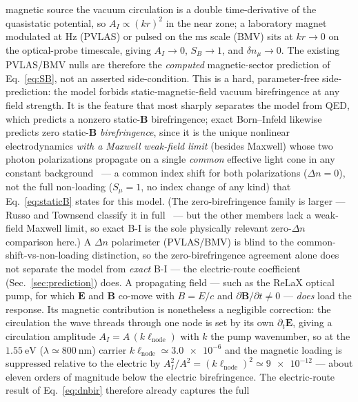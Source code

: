 \documentclass[aps,prd,twocolumn,superscriptaddress,nofootinbib,longbibliography]{revtex4-2}
\begin{document}
magnetic source the vacuum circulation is a double time-derivative of the
quasistatic potential, so $A_I\propto(kr)^2$ in the near zone; a laboratory magnet
modulated at $\si{\hertz}$ (PVLAS) or pulsed on the $\si{\milli\second}$ scale
(BMV) sits at $kr\to0$ on the optical-probe timescale, giving $A_I\to0$,
$S_B\to1$, and $\delta n_\mu\to0$. The existing PVLAS/BMV nulls are therefore the
\emph{computed} magnetic-sector prediction of Eq.~\eqref{eq:SB}, not an asserted
side-condition. This is a hard, parameter-free side-prediction: the model forbids
static-magnetic-field vacuum birefringence at any field strength. It is the
feature that most sharply separates the model from QED, which predicts a nonzero
static-$\mathbf B$ birefringence; exact Born--Infeld likewise predicts zero
static-$\mathbf B$ \emph{birefringence}, since it is the unique nonlinear
electrodynamics \emph{with a Maxwell weak-field limit} (besides Maxwell) whose two
photon polarizations propagate on a single \emph{common} effective light cone in
any constant background~\cite{Boillat1970,BornInfeld1934} --- a common index shift
for both polarizations ($\Delta n=0$), not the full non-loading ($S_\mu=1$, no
index change of any kind) that Eq.~\eqref{eq:staticB} states for this model. (The
zero-birefringence family is larger --- Russo and Townsend classify it in
full~\cite{RussoTownsend2023} --- but the other members lack a weak-field Maxwell
limit, so exact B-I is the sole physically relevant zero-$\Delta n$ comparison
here.) A $\Delta n$ polarimeter (PVLAS/BMV) is blind to the common-shift-vs-non-loading
distinction, so the zero-birefringence agreement alone does not separate the model
from \emph{exact} B-I --- the electric-route
coefficient (Sec.~\ref{sec:prediction}) does. A propagating field --- such as the
ReLaX optical pump, for which
$\mathbf E$ and $\mathbf B$ co-move with $B=E/c$ and $\partial\mathbf
B/\partial t\ne0$ --- \emph{does} load the response. Its magnetic contribution is
nonetheless a negligible correction: the circulation the wave threads through one
node is set by its own $\partial_t\mathbf E$, giving a circulation amplitude
$A_I=A\,(k\ell_{\mathrm{node}})$ with $k$ the pump wavenumber, so at the
$\SI{1.55}{\electronvolt}$ ($\lambda\simeq\SI{800}{\nano\meter}$) carrier
$k\ell_{\mathrm{node}}\simeq\num{3.0e-6}$ and the magnetic loading is suppressed
relative to the electric by $A_I^2/A^2=(k\ell_{\mathrm{node}})^2\simeq\num{9e-12}$
--- about eleven orders of magnitude below the electric birefringence. The
electric-route result of Eq.~\eqref{eq:dnbir} therefore already captures the full
\end{document}
